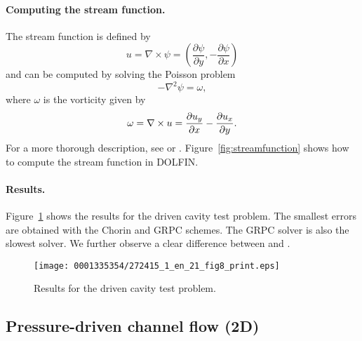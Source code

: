 \paragraph{Computing the stream function.}

The stream function is defined by
\begin{equation}
  u = \nabla \times \psi
  = (\frac{\partial{\psi}}{\partial{y}}, -\frac{\partial{\psi}}{\partial{x}})
\end{equation}
and can be computed by solving the Poisson problem
\begin{equation}
  -\nabla^2 \psi = \omega,
 \end{equation}
where $\omega$ is the vorticity given by\vspace*{4pt}
\begin{equation}
\omega = \nabla \times u
=\frac{\partial{u_y}}{\partial{x}} - \frac{\partial{u_x}}{\partial{y}}.\vspace*{2pt}
\end{equation}
For a more thorough description, see \citet{White1999}
or \citet{White1991}. Figure~\ref{fig:streamfunction} shows how to
compute the stream function in DOLFIN.



\paragraph{Results.}

Figure~\ref{fig:drivencavity_CPU_and_errors} shows the results for the
driven cavity test problem.  The smallest errors are obtained with the
Chorin and GRPC schemes. The GRPC solver is also the slowest
solver. We further observe a clear difference between  and
.

\begin{figure}[!t]
\centering
\texttt{[image: 0001335354/272415\_1\_en\_21\_fig8\_print.eps]}
\caption{Results for the driven cavity test problem.}
\label{fig:drivencavity_CPU_and_errors}\vspace*{5pt}
\end{figure}

\vspace*{3pt}
\subsection{Pressure-driven channel flow (2D)}

